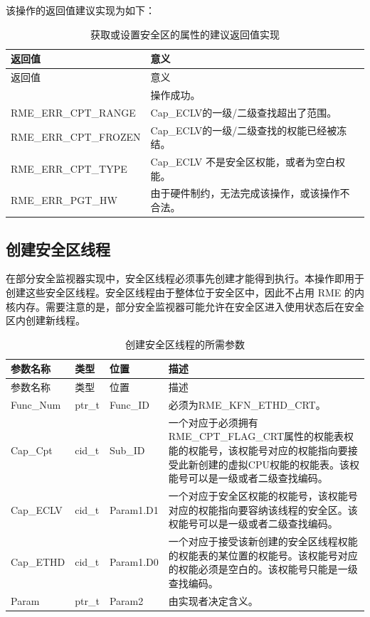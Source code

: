 该操作的返回值建议实现为如下：

\begin{xltabular}{\textwidth}{@{}>{\hsize\raggedright\arraybackslash}X>{\hsize\raggedright\arraybackslash}X@{}}
\caption{获取或设置安全区的属性的建议返回值实现}\label{tab:8-99-get-or-set-enclave-attributes-suggested-return-values}\\
\toprule
返回值 & 意义\tabularnewline
\endfirsthead
\toprule
返回值 & 意义\tabularnewline
\midrule
\endhead
\bottomrule
{} & 操作成功。\tabularnewline
    RME\_ERR\_CPT\_RANGE & Cap\_ECLV的一级/二级查找超出了范围。\tabularnewline
    RME\_ERR\_CPT\_FROZEN & Cap\_ECLV的一级/二级查找的权能已经被冻结。\tabularnewline
    RME\_ERR\_CPT\_TYPE & Cap\_ECLV 不是安全区权能，或者为空白权能。\tabularnewline
    
    RME\_ERR\_PGT\_HW & 由于硬件制约，无法完成该操作，或该操作不合法。\tabularnewline
\end{xltabular}

\subsection{创建安全区线程}\label{subsec:8-create-enclave-thread}

在部分安全监视器实现中，安全区线程必须事先创建才能得到执行。本操作即用于创建这些安全区线程。安全区线程由于整体位于安全区中，因此不占用 RME 的内核内存。需要注意的是，部分安全监视器可能允许在安全区进入使用状态后在安全区内创建新线程。

\begin{xltabular}{\textwidth}{@{}>{\hsize\raggedright\arraybackslash}X>{\hsize\raggedright\arraybackslash}X>{\hsize\raggedright\arraybackslash}X>{\hsize\raggedright\arraybackslash}X@{}}
\caption{创建安全区线程的所需参数}\label{tab:8-100-create-enclave-thread-parameters}\\
\toprule
参数名称 & 类型 & 位置 & 描述\tabularnewline
\endfirsthead
\toprule
参数名称 & 类型 & 位置 & 描述\tabularnewline
\midrule
\endhead
\bottomrule
\endlastfoot
Func\_Num & ptr\_t & Func\_ID &
必须为RME\_KFN\_ETHD\_CRT。\tabularnewline
Cap\_Cpt & cid\_t & Sub\_ID &
一个对应于必须拥有RME\_CPT\_FLAG\_CRT属性的权能表权能的权能号，该权能号对应的权能指向要接受此新创建的虚拟CPU权能的权能表。该权能号可以是一级或者二级查找编码。\tabularnewline
Cap\_ECLV & cid\_t & Param1.D1 &
一个对应于安全区权能的权能号，该权能号对应的权能指向要容纳该线程的安全区。该权能号可以是一级或者二级查找编码。\tabularnewline
Cap\_ETHD & cid\_t & Param1.D0 &
一个对应于接受该新创建的安全区线程权能的权能表的某位置的权能号。该权能号对应的权能必须是空白的。该权能号只能是一级查找编码。\tabularnewline
Param & ptr\_t & Param2 & 由实现者决定含义。\tabularnewline
\end{xltabular}


